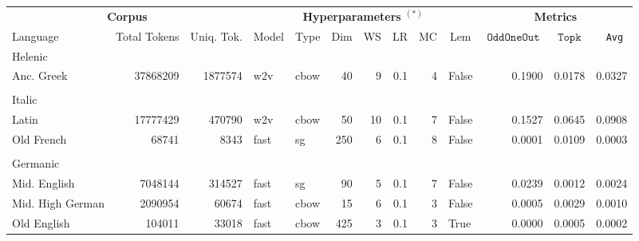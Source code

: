 \documentclass[11pt,a4paper]{article}
\DeclareMathOperator{\OddOneOut}{\texttt{OddOneOut}}
\DeclareMathOperator{\topk}{\texttt{Topk}}
\begin{document}
\begin{table}[t]
\centering
\scriptsize
\begin{tabular}{lrrllrrrrlrrr}
\toprule
    \multicolumn{3}{c}{\bf Corpus} & \multicolumn{7}{c}{\bf Hyperparameters $^{(*)}$} & \multicolumn{3}{c}{\bf Metrics} \\
\cmidrule(lr){1-3}\cmidrule(lr){4-10}\cmidrule(lr){11-13}
 \multicolumn{1}{l}{Language} & \multicolumn{1}{r}{Total Tokens} & \multicolumn{1}{r}{Uniq. Tok.} & \multicolumn{1}{l}{Model} & \multicolumn{1}{l}{Type} & \multicolumn{1}{r}{Dim} & \multicolumn{1}{r}{WS} & \multicolumn{1}{r}{LR} & \multicolumn{1}{r}{MC} & \multicolumn{1}{c}{Lem} & \multicolumn{1}{c}{\tiny$\OddOneOut$} & \multicolumn{1}{c}{$\topk$} & \multicolumn{1}{c}{\texttt{ Avg}} \\
    \midrule
    Helenic&&&&&&&&&&&&\\
 \quad Anc. Greek & \num{37868209} & \num{1877574} & w2v & cbow &  \num{40} &  \num{9} &  \num{.1} &  \num{4} & False & \num{0.1900} & \num{0.0178} & \num{0.0327}\\
    &&&&&&&&&&&&\\[-4pt]
    Italic&&&&&&&&&&&&\\
 \quad Latin & \num{17777429} & \num{470790} & w2v & cbow &  \num{50} &  \num{10} &  \num{.1} &  \num{7} & False &  \num{0.1527} &  \num{0.0645} &  \num{0.0908}\\ 
   \quad Old French  & \num{68741} & \num{8343} &  fast & sg & \num{250} & \num{6} & \num{.1} & \num{8}  & False & \num{0.0001} & \num{0.0109} & \num{0.0003}\\
    &&&&&&&&&&&&\\[-4pt]
    Germanic &&&&&&&&&&&& \\
\quad Mid. English & \num{7048144} & \num{314527} & fast & sg & \num{90} & \num{5} & \num{.1} & \num{7} & False & \num{0.0239} & \num{0.0012} & \num{0.0024} \\
   \quad Mid. High German & \num{2090954} & \num{60674} & fast & cbow & \num{15} & \num{6} & \num{.1} & \num{3} & False & \num{0.0005} & \num{0.0029} & \num{0.0010} \\
   \quad Old English  & \num{104011} & \num{33018} & fast & cbow & \num{425} & \num{3} & \num{.1} & \num{3} & True & \num{0.0000} & \num{0.0005}  & \num{0.0002} \\

\end{tabular}
\end{table}
\end{document}
